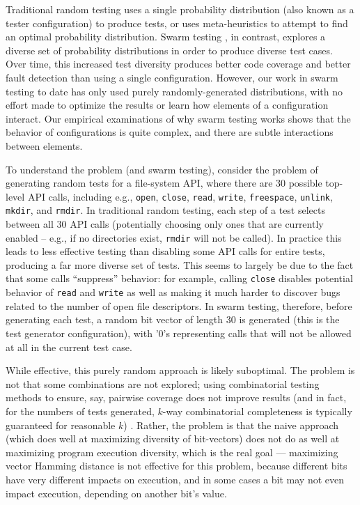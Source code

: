 Traditional random testing uses a single probability distribution (also
known as a tester configuration) to produce tests, or uses
meta-heuristics to attempt to find an optimal probability
distribution.  Swarm testing \cite{ISSTA12}, in contrast, explores a
diverse set of probability distributions in order to produce diverse
test cases.  Over time, this increased test diversity produces better
code coverage and better fault detection than using a single
configuration.  However, our work in swarm testing to date has only
used purely randomly-generated distributions, with no effort made to
optimize the results or learn how elements of a configuration
interact.  Our empirical examinations of why swarm testing works
\cite{helphelp} shows that the behavior of configurations is quite
complex, and there are subtle interactions between elements.

To understand the problem (and swarm testing), consider the problem of
generating random tests for a file-system API, where there are 30
possible top-level API calls, including e.g., {\tt open}, {\tt close},
{\tt read}, {\tt write}, {\tt freespace}, {\tt unlink}, {\tt mkdir},
and {\tt rmdir}.  In traditional random testing, each step of a test
selects between all 30 API calls (potentially choosing only ones that
are currently enabled -- e.g., if no directories exist, {\tt rmdir}
will not be called).  In practice this leads to less effective testing
than disabling some API calls for entire tests, producing a far more
diverse set of tests.  This seems to largely be due to the fact that
some calls ``suppress'' behavior: for example, calling {\tt close}
disables potential behavior of {\tt read} and {\tt write} as well as
making it much harder to discover bugs related to the number of open
file descriptors.  In swarm testing, therefore, before generating each
test, a random bit vector of length 30 is generated (this is the test
generator configuration), with '0's representing calls that will not
be allowed at all in the current test case.

While effective, this purely random approach is likely suboptimal.
The problem is not that some combinations are not explored;
using combinatorial testing methods to ensure, say, pairwise coverage
does not improve results (and in fact, for the numbers of tests
generated, $k$-way combinatorial completeness is typically guaranteed
for reasonable $k$) \cite{ISSTA12}.  Rather, the problem is that the
naive approach (which does well at maximizing diversity of
bit-vectors) does not do as well at maximizing program execution
diversity, which is the real goal --- maximizing vector Hamming
distance is not effective for this problem, because different bits
have very different impacts on execution, and in some cases a bit may
not even impact execution, depending on another bit's value.

